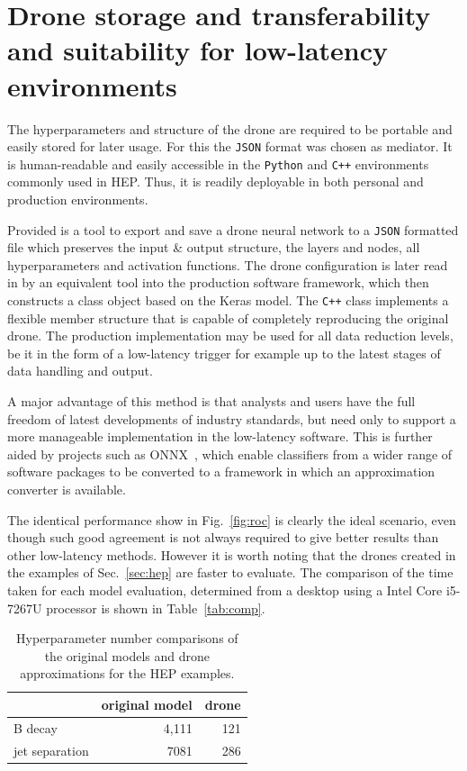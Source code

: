 \documentclass[final,5p,times,twocolumn]{elsarticle}
\begin{document}
\section{Drone storage and transferability and suitability
for low-latency environments}
\label{sec:storage}

The hyperparameters and structure of the drone are required to be
portable and easily stored for later usage. For this the {\tt JSON} format was chosen as
mediator. It is human-readable and easily accessible in the {\tt Python} and {\tt C++}
environments commonly used in HEP. Thus, it is readily deployable in both personal and production environments.

Provided is a tool to export and save a drone neural network to a {\tt JSON}
formatted file which preserves the input \& output structure,
the layers and nodes, all hyperparameters and activation functions.
The drone configuration is later read in by an equivalent tool into the production software framework,
which then constructs a class object based on the Keras model. The {\tt C++} class implements
a flexible member structure that is capable of completely reproducing the original drone. The production
implementation may be used for all data reduction levels, be it in the form of a low-latency trigger
for example up to the latest stages of data handling and output.

A major advantage of this method is that analysts and users have the full freedom of latest developments
of industry standards, but need only to support a more manageable implementation in the low-latency
software. This is further aided by projects such as ONNX~\cite{ONNX}, which enable classifiers from a wider
range of software packages to be converted to a framework in which an approximation converter
is available.

The identical performance show in Fig.~\ref{fig:roc} is clearly the ideal scenario, even though
such good agreement is not always required to give better results than other low-latency methods.
However it is worth noting that the drones created in the examples of Sec.~\ref{sec:hep} are faster to
evaluate. The comparison of the time taken for each model evaluation, determined from a desktop
using a Intel Core i5-7267U processor is shown in Table~\ref{tab:comp}.
\begin{table}[t]
  \centering
  \caption{Hyperparameter number comparisons of the original models and drone
  approximations for the HEP examples. \label{tab:comp_param}}
  \begin{tabular}{l|rr}
                   & original model                  & drone \\
    \hline
    B decay        & 4,111 & 121 \\
    jet separation & 7081 & 286 \\
  \end{tabular}
\end{table}
\end{document}
